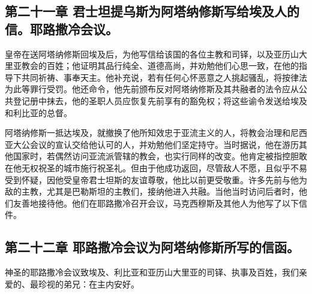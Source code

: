 
\subsection{第二十一章 君士坦提乌斯为阿塔纳修斯写给埃及人的信。耶路撒冷会议。}

皇帝在送阿塔纳修斯回埃及后，为他写信给该国的各位主教和司铎，以及亚历山大里亚教会的百姓；他证明其品行纯全、道德高尚，并劝勉他们心思一致，在他的指导下共同祈祷、事奉天主。他补充说，若有任何心怀恶意之人挑起骚乱，将按律法为此等罪行受罚。他还命令，他先前颁布反对阿塔纳修斯及其共融者的法令应从公共登记册中抹去，他的圣职人员应恢复先前享有的豁免权；将这些谕令发送给埃及和利比亚的总督。\par

阿塔纳修斯一抵达埃及，就撤换了他所知效忠于亚流主义的人，将教会治理和尼西亚大公会议的宣认交给他认可的人，并劝勉他们坚定持守。当时据说，他在游历其他国家时，若偶然访问亚流派管辖的教会，也实行同样的改变。他肯定被指控胆敢在他无权祝圣的城市施行祝圣礼。但由于他成功返回，尽管敌人不愿，且似乎不易受到怀疑，因他受皇帝君士坦斯的友谊尊敬，他比以前更受敬重。许多先前与他为敌的主教，尤其是巴勒斯坦的主教们，接纳他进入共融。当他当时访问后者时，他们友善地接待他。他们在耶路撒冷召开会议，马克西穆斯及其他人为他写了以下信件。\par


\subsection{第二十二章 耶路撒冷会议为阿塔纳修斯所写的信函。}

神圣的耶路撒冷会议致埃及、利比亚和亚历山大里亚的司铎、执事及百姓，我们亲爱的、最珍视的弟兄：在主内安好。\par

\par

